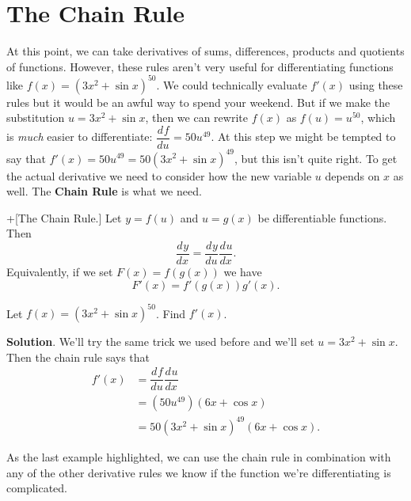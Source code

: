 \documentclass[10pt,]{book}
\newcommand{\terminology}[1]{\textbf{#1}}
\theoremstyle{ptxplainnotitle}
\theoremstyle{ptxplaintitle}
\theoremstyle{ptxplainnotitle}
\theoremstyle{ptxplaintitle}
\theoremstyle{ptxplainnotitle}
\theoremstyle{ptxplaintitle}
\theoremstyle{ptxdefinitionnotitle}
\theoremstyle{ptxdefinitiontitle}
\theoremstyle{ptxdefinitionnotitle}
\theoremstyle{ptxdefinitiontitle}
\theoremstyle{ptxdefinitionnotitle}
\theoremstyle{ptxdefinitiontitle}
\theoremstyle{ptxdefinitionnotitle}
\theoremstyle{ptxdefinitiontitle}
\theoremstyle{ptxdefinitionnotitle}
\theoremstyle{ptxdefinitiontitle}
\numberwithin{equation}{section}
\newcommand{\dv}[3][]{\dfrac{d^{#1} #2}{d #3^{#1}}}
\begin{document}
\section[{The Chain Rule}]{The Chain Rule}\label{section-the-chain-rule}
\hypertarget{p-149}{}%
At this point, we can take derivatives of sums, differences, products and quotients of functions. However, these rules aren't very useful for differentiating functions like \(f(x) = (3x^{2} + \sin x)^{50}\). We could technically evaluate \(f'(x)\) using these rules but it would be an awful way to spend your weekend. But if we make the substitution \(u = 3x^{2} + \sin x\), then we can rewrite \(f(x)\) as \(f(u) = u^{50}\), which is \emph{much} easier to differentiate: \(\dv{f}{u} = 50u^{49}\). At this step we might be tempted to say that \(f'(x) = 50u^{49} = 50(3x^{2} + \sin x)^{49}\), but this isn't quite right. To get the actual derivative we need to consider how the new variable \(u\) depends on \(x\) as well. The \terminology{Chain Rule} is what we need.%
\begin{theorem}+[{The Chain Rule.}]\label{theorem-the-chain-rule}
\hypertarget{p-150}{}%
Let \(y = f(u)\) and \(u = g(x)\) be differentiable functions. Then%
\begin{equation*}
\dv{y}{x} = \dv{y}{u}\dv{u}{x}.
\end{equation*}
Equivalently, if we set \(F(x) = f(g(x))\) we have%
\begin{equation*}
F'(x) = f'(g(x))g'(x).
\end{equation*}
%
\end{theorem}
\begin{example}\label{example-using-the-chain-rule}
\hypertarget{p-151}{}%
Let \(f(x) = (3x^{2} + \sin x)^{50}\). Find \(f'(x)\).%
\par\smallskip%
\noindent\textbf{Solution}.\hypertarget{solution-30}{}\quad%
\hypertarget{p-152}{}%
We'll try the same trick we used before and we'll set \(u = 3x^{2} + \sin x\). Then the chain rule says that%
\begin{align*}
f'(x) & =\dv{f}{u}\dv{u}{x} \\
& = (50u^{49})(6x+\cos x) \\
& = 50(3x^{2} + \sin x)^{49}(6x + \cos x). 
\end{align*}
%
\end{example}
\hypertarget{p-153}{}%
As the last example highlighted, we can use the chain rule in combination with any of the other derivative rules we know if the function we're differentiating is complicated.%
\end{document}
